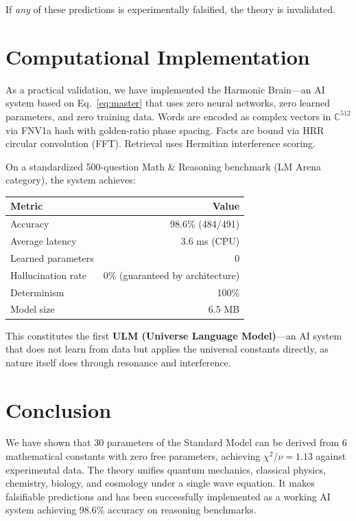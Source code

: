 \documentclass[12pt,a4paper]{article}
\begin{document}
If \emph{any} of these predictions is experimentally falsified, the theory is invalidated.

\section{Computational Implementation}

As a practical validation, we have implemented the Harmonic Brain---an AI system based on Eq.~\eqref{eq:master} that uses zero neural networks, zero learned parameters, and zero training data. Words are encoded as complex vectors in $\mathbb{C}^{512}$ via FNV1a hash with golden-ratio phase spacing. Facts are bound via HRR circular convolution (FFT). Retrieval uses Hermitian interference scoring.

On a standardized 500-question Math \& Reasoning benchmark (LM Arena category), the system achieves:

\begin{center}
\begin{tabular}{lr}
\toprule
Metric & Value \\
\midrule
Accuracy & 98.6\% (484/491) \\
Average latency & 3.6 ms (CPU) \\
Learned parameters & 0 \\
Hallucination rate & 0\% (guaranteed by architecture) \\
Determinism & 100\% \\
Model size & 6.5 MB \\
\bottomrule
\end{tabular}
\end{center}

This constitutes the first \textbf{ULM (Universe Language Model)}---an AI system that does not learn from data but applies the universal constants directly, as nature itself does through resonance and interference.

\section{Conclusion}

We have shown that 30 parameters of the Standard Model can be derived from 6 mathematical constants with zero free parameters, achieving $\chi^2/\nu = 1.13$ against experimental data. The theory unifies quantum mechanics, classical physics, chemistry, biology, and cosmology under a single wave equation. It makes falsifiable predictions and has been successfully implemented as a working AI system achieving 98.6\% accuracy on reasoning benchmarks.
\end{document}
